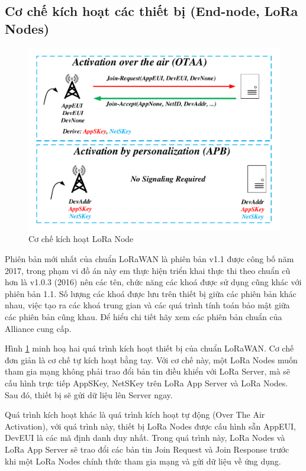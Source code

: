 \subsection{Cơ chế kích hoạt các thiết bị (End-node, LoRa Nodes)}
		\begin{figure}[h!] %
			\centering
			\includegraphics[width=\linewidth]{./img/214.pdf}
			\caption{Cơ chế kích hoạt LoRa Node}
			\label{fig:fig214}
	\end{figure}
Phiên bản mới nhất của chuẩn LoRaWAN là phiên bản v1.1 được công bố năm 2017, trong phạm vi đồ án này em thực hiện triển khai thực thi theo chuẩn cũ hơn là v1.0.3 (2016) nên các tên, chức năng các khoá được sử dụng cũng khác với phiên bản 1.1. Số lượng các khoá được lưu trên thiết bị giữa các phiên bản khác nhau, việc tạo ra các khoá trung gian và các quá trình tính toán bảo mật giữa các phiên bản cũng khau. Để hiểu chi tiết hãy xem các phiên bản chuẩn của Alliance cung cấp. \par 
	Hình \ref{fig:fig214} minh hoạ hai quá trình kích hoạt thiết bị của chuẩn LoRaWAN. Cơ chế đơn giản là cơ chế tự kích hoạt bằng tay. Với cơ chế này, một LoRa Nodes muốn tham gia mạng không phải trao đổi bản tin điều khiển với LoRa Server, mà sẽ cấu hình trực tiếp AppSKey, NetSKey trên LoRa App Server và LoRa Nodes. Sau đó, thiết bị sẽ gửi dữ liệu lên Server ngay. \par 
	Quá trình kích hoạt khác là quá trình kích hoạt tự động (Over The Air Activation), với quá trình này, thiết bị LoRa Nodes được cấu hình sẵn AppEUI, DevEUI là các mã định danh duy nhất. Trong quá trình này, LoRa Nodes và LoRa App Server sẽ trao đổi các bản tin Join Request và Join Response trước khi một LoRa Nodes chính thức tham gia mạng và gửi dữ liệu về ứng dụng. 


